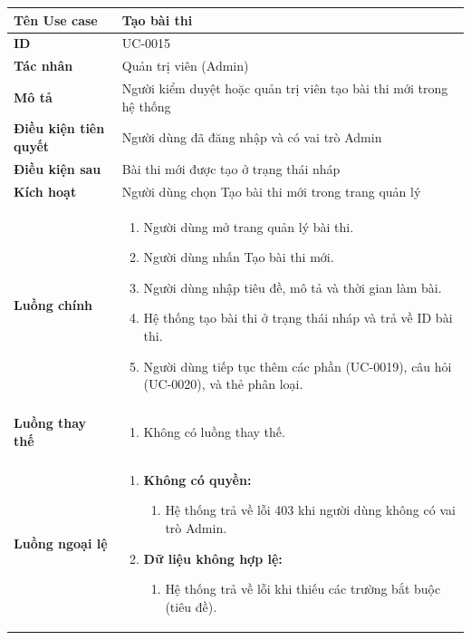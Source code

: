 {
\small
\renewcommand{\arraystretch}{1.15}

\begin{tabularx}{\textwidth}{|>{\raggedright\arraybackslash}p{3.5cm}|>{\raggedright\arraybackslash}X|}
\hline
\textbf{Tên Use case} & Tạo bài thi \\
\hline
\textbf{ID} & UC-0015 \\
\hline
\textbf{Tác nhân} & Quản trị viên (Admin) \\
\hline
\textbf{Mô tả} & Người kiểm duyệt hoặc quản trị viên tạo bài thi mới trong hệ thống \\
\hline
\textbf{Điều kiện tiên quyết} & Người dùng đã đăng nhập và có vai trò Admin \\
\hline
\textbf{Điều kiện sau} & Bài thi mới được tạo ở trạng thái nháp \\
\hline
\textbf{Kích hoạt} & Người dùng chọn Tạo bài thi mới trong trang quản lý \\
\hline
\textbf{Luồng chính} &
\begin{enumerate}
    \item Người dùng mở trang quản lý bài thi.
    \item Người dùng nhấn Tạo bài thi mới.
    \item Người dùng nhập tiêu đề, mô tả và thời gian làm bài.
    \item Hệ thống tạo bài thi ở trạng thái nháp và trả về ID bài thi.
    \item Người dùng tiếp tục thêm các phần (UC-0019), câu hỏi (UC-0020), và thẻ phân loại.
\end{enumerate} \\
\hline
\textbf{Luồng thay thế} &
\begin{enumerate}
    \item Không có luồng thay thế.
\end{enumerate} \\
\hline
\textbf{Luồng ngoại lệ} &
\begin{enumerate}
    \item \textbf{Không có quyền:}
    \begin{enumerate}
        \item[2Err.] Hệ thống trả về lỗi 403 khi người dùng không có vai trò Admin.
    \end{enumerate}
    \item \textbf{Dữ liệu không hợp lệ:}
    \begin{enumerate}
        \item[4Err.] Hệ thống trả về lỗi khi thiếu các trường bắt buộc (tiêu đề).
    \end{enumerate}
\end{enumerate} \\
\hline
\end{tabularx}
}

